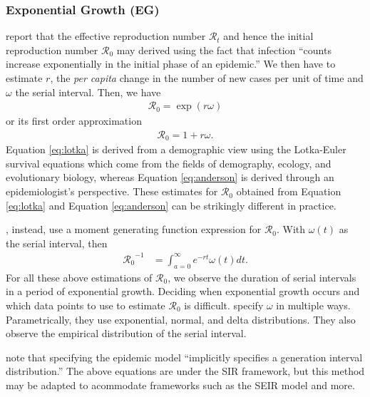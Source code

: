 \documentclass[12pt]{article}
\newcommand{\rr}{\ensuremath{\mathcal{R}_0}}
\begin{document}
\subsubsection{Exponential Growth (EG)}
\label{sec:expgrowth}
\cite{wallinga2007generation} report that the effective reproduction number $\mathcal{R}_t$ and hence the initial reproduction number $\rr$ may derived using the fact that infection ``counts increase exponentially in the initial phase of an epidemic.''  We then have to estimate $r$, the \textit{per capita} change in the number of new cases per unit of time and $\omega$ the serial interval. Then, we have
\begin{align}\label{eq:lotka}
\rr = \exp{(r \omega)}
\end{align}
or its first order approximation
\begin{align}\label{eq:anderson}
\rr = 1 + r \omega.
\end{align}
Equation \eqref{eq:lotka} is derived from a demographic view using the Lotka-Euler survival equations which come from the fields of demography, ecology, and evolutionary biology, whereas Equation \eqref{eq:anderson} is derived through an epidemiologist's perspective.  These estimates for $\rr$ obtained from Equation \eqref{eq:lotka} and Equation \eqref{eq:anderson} can be strikingly different in practice.

\cite{wallinga2007generation}, instead, use a moment generating function expression for $\rr$.  With $\omega(t)$ as the serial interval, then
\begin{align*}
\rr^{-1} &= \int_{a=0}^\infty e^{-rt}\omega(t)dt.
\end{align*}
For all these above estimations of $\rr$, we observe the duration of serial intervals in a period of exponential growth.  Deciding when exponential growth occurs and which data points to use to estimate $\rr$ is difficult.  \citeauthor{wallinga2007generation} specify $\omega$ in multiple ways.  Parametrically, they use exponential, normal, and delta distributions.  They also observe the empirical distribution of the serial interval.

\citeauthor{wallinga2007generation} note that specifying the epidemic model ``implicitly specifies a generation interval distribution.''  The above equations are under the SIR framework, but this method may be adapted to acommodate frameworks such as the SEIR model and more.
\end{document}

